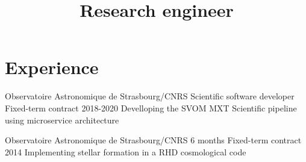 \documentclass[11pt,a4paper,sans]{moderncv}
\title{Research engineer}
\newcommand{\aton}{{\texttt{ATON}}}
\begin{document}
\makecvtitle


%
%


\section{Experience}

\cventry
{Observatoire Astronomique de Strasbourg/CNRS}
{Scientific software developer}
{Fixed-term contract}
{2018-2020}
{}
{}
{Develloping the SVOM MXT Scientific pipeline using microservice architecture}


\cventry
{Observatoire Astronomique de Strasbourg/CNRS}
{6 months}
{Fixed-term contract}
{2014}
{}
{}
{Implementing stellar formation in a RHD cosmological code}


\end{document}
